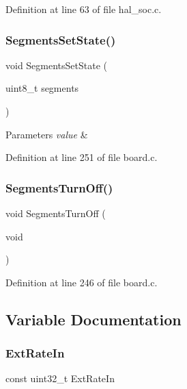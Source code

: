 Definition at line 63 of file hal\+\_\+soc.\+c.

\mbox{\label{group__hal_gae15c80f1fc4f726afc46735ce5a60877}} 
\subsubsection{\texorpdfstring{Segments\+Set\+State()}{SegmentsSetState()}}
{\footnotesize\ttfamily void Segments\+Set\+State (\begin{DoxyParamCaption}\item[{uint8\+\_\+t}]{segments }\end{DoxyParamCaption})}


\begin{DoxyParams}{Parameters}
{\em value} & \\
\hline
\end{DoxyParams}


Definition at line 251 of file board.\+c.

\mbox{\label{group__hal_ga76d9235760f7648a267f3b754ec0abf7}} 
\subsubsection{\texorpdfstring{Segments\+Turn\+Off()}{SegmentsTurnOff()}}
{\footnotesize\ttfamily void Segments\+Turn\+Off (\begin{DoxyParamCaption}\item[{void}]{ }\end{DoxyParamCaption})}



Definition at line 246 of file board.\+c.



\subsection{Variable Documentation}
\mbox{\label{group__hal_ga74ceed751e84a920be263a7fe3da67f0}} 
\subsubsection{\texorpdfstring{Ext\+Rate\+In}{ExtRateIn}\hspace{0.1cm}{\footnotesize\ttfamily [1/2]}}
{\footnotesize\ttfamily const uint32\+\_\+t Ext\+Rate\+In}



